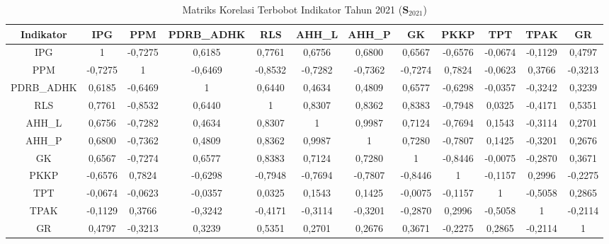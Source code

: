 \begin{table}[H]
\centering
\caption{Matriks Korelasi Terbobot Indikator Tahun 2021 ($\mathbf{S}_{2021}$)} \label{tab:app2matriks_intra_loading_2021}
\begin{adjustbox}{max width=\textwidth, max height=0.85\textheight}
\begin{tabular}{|c|c|c|c|c|c|c|c|c|c|c|c|}
\hline
\textbf{Indikator} & \textbf{IPG} & \textbf{PPM} & \textbf{PDRB\_ADHK} & \textbf{RLS} & \textbf{AHH\_L} & \textbf{AHH\_P} & \textbf{GK} & \textbf{PKKP} & \textbf{TPT} & \textbf{TPAK} & \textbf{GR} \\
\hline
IPG & 1 & -0,7275 & 0,6185 & 0,7761 & 0,6756 & 0,6800 & 0,6567 & -0,6576 & -0,0674 & -0,1129 & 0,4797 \\
PPM & -0,7275 & 1 & -0,6469 & -0,8532 & -0,7282 & -0,7362 & -0,7274 & 0,7824 & -0,0623 & 0,3766 & -0,3213 \\
PDRB\_ADHK & 0,6185 & -0,6469 & 1 & 0,6440 & 0,4634 & 0,4809 & 0,6577 & -0,6298 & -0,0357 & -0,3242 & 0,3239 \\
RLS & 0,7761 & -0,8532 & 0,6440 & 1 & 0,8307 & 0,8362 & 0,8383 & -0,7948 & 0,0325 & -0,4171 & 0,5351 \\
AHH\_L & 0,6756 & -0,7282 & 0,4634 & 0,8307 & 1 & 0,9987 & 0,7124 & -0,7694 & 0,1543 & -0,3114 & 0,2701 \\
AHH\_P & 0,6800 & -0,7362 & 0,4809 & 0,8362 & 0,9987 & 1 & 0,7280 & -0,7807 & 0,1425 & -0,3201 & 0,2676 \\
GK & 0,6567 & -0,7274 & 0,6577 & 0,8383 & 0,7124 & 0,7280 & 1 & -0,8446 & -0,0075 & -0,2870 & 0,3671 \\
PKKP & -0,6576 & 0,7824 & -0,6298 & -0,7948 & -0,7694 & -0,7807 & -0,8446 & 1 & -0,1157 & 0,2996 & -0,2275 \\
TPT & -0,0674 & -0,0623 & -0,0357 & 0,0325 & 0,1543 & 0,1425 & -0,0075 & -0,1157 & 1 & -0,5058 & 0,2865 \\
TPAK & -0,1129 & 0,3766 & -0,3242 & -0,4171 & -0,3114 & -0,3201 & -0,2870 & 0,2996 & -0,5058 & 1 & -0,2114 \\
GR & 0,4797 & -0,3213 & 0,3239 & 0,5351 & 0,2701 & 0,2676 & 0,3671 & -0,2275 & 0,2865 & -0,2114 & 1 \\
\hline
\end{tabular}
\end{adjustbox}
\end{table}